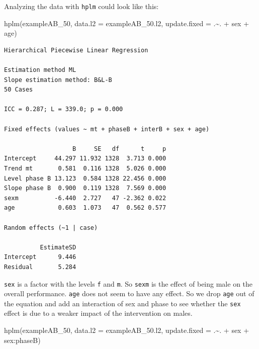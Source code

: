\documentclass[
]{book}
\newenvironment{Shaded}{\begin{snugshade}}{\end{snugshade}}
\newcommand{\AttributeTok}[1]{\textcolor[rgb]{0.77,0.63,0.00}{#1}}
\newcommand{\FunctionTok}[1]{\textcolor[rgb]{0.00,0.00,0.00}{#1}}
\newcommand{\NormalTok}[1]{#1}
\newcommand{\SpecialCharTok}[1]{\textcolor[rgb]{0.00,0.00,0.00}{#1}}
\begin{document}
Analyzing the data with \texttt{hplm} could look like this:

\begin{Shaded}
\begin{Highlighting}[]
\FunctionTok{hplm}\NormalTok{(exampleAB\_50, }\AttributeTok{data.l2 =}\NormalTok{ exampleAB\_50.l2, }\AttributeTok{update.fixed =}\NormalTok{ .}\SpecialCharTok{\textasciitilde{}}\NormalTok{. }\SpecialCharTok{+}\NormalTok{ sex }\SpecialCharTok{+}\NormalTok{ age)}
\end{Highlighting}
\end{Shaded}

\begin{verbatim}
Hierarchical Piecewise Linear Regression

Estimation method ML 
Slope estimation method: B&L-B 
50 Cases

ICC = 0.287; L = 339.0; p = 0.000

Fixed effects (values ~ mt + phaseB + interB + sex + age)

                   B     SE   df      t     p
Intercept     44.297 11.932 1328  3.713 0.000
Trend mt       0.581  0.116 1328  5.026 0.000
Level phase B 13.123  0.584 1328 22.456 0.000
Slope phase B  0.900  0.119 1328  7.569 0.000
sexm          -6.440  2.727   47 -2.362 0.022
age            0.603  1.073   47  0.562 0.577

Random effects (~1 | case)

          EstimateSD
Intercept      9.446
Residual       5.284
\end{verbatim}

\texttt{sex} is a factor with the levels \texttt{f} and \texttt{m}. So \texttt{sexm} is the effect of being male on the overall performance. \texttt{age} does not seem to have any effect. So we drop \texttt{age} out of the equation and add an interaction of sex and phase to see whether the \texttt{sex} effect is due to a weaker impact of the intervention on males.

\begin{Shaded}
\begin{Highlighting}[]
\FunctionTok{hplm}\NormalTok{(exampleAB\_50, }\AttributeTok{data.l2 =}\NormalTok{ exampleAB\_50.l2, }\AttributeTok{update.fixed =}\NormalTok{ .}\SpecialCharTok{\textasciitilde{}}\NormalTok{. }\SpecialCharTok{+}\NormalTok{ sex }\SpecialCharTok{+}\NormalTok{ sex}\SpecialCharTok{:}\NormalTok{phaseB)}
\end{Highlighting}
\end{Shaded}
\end{document}
